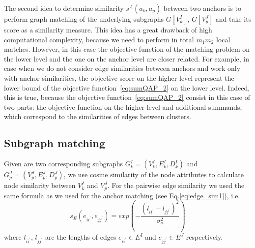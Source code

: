The second idea to determine similarity $s^A(a_k, a_p)$ between two anchors is to perform graph matching of the underlying subgraphs $G[V^I_k]$, $G[V^J_p]$ and take its score as a similarity measure. This idea has a great drawback of high computational complexity, because we need to perform in total $m_1m_2$ local matches. However, in this case the objective function of the matching problem on the lower level and the one on the anchor level are closer related. For example, in case when we do not consider edge similarities between anchors and work only with anchor similarities, the objective score on the higher level represent the lower bound of the objective function~\eqref{eq:sumQAP_2} on the lower level.  %
Indeed, this is true, because the objective function~\eqref{eq:sumQAP_2} consist in this case of two parts: the objective function on the higher level and additional summands, which correspond to the similarities of edges between clusters.
\subsection{Subgraph matching}
Given are two corresponding subgraphs $G^I_{k}=(V^I_{k},E^I_{k},D^I_{k})$ and $G^J_{p}=(V^J_{p},E^J_{p},D^J_{p})$, we use cosine similarity of the node attributes to calculate node similarity between $V^I_{k}$ and $V^J_{p}$. For the pairwise edge similarity we used the same formula as we used for the anchor matching (see Eq.\eqref{eq:edge_sim1}), i.e.\ 
\begin{equation*}
s_E(e_{ii^\prime}, e_{jj^\prime}) = exp(-\frac{(l_{ii^\prime} - l_{jj^\prime})^2}{\sigma^2_{s}})
\end{equation*}
where $l_{ii^\prime}$, $l_{jj^\prime} $ are the lengths of edges $e_{ii^\prime}\in E^I$ and $e_{jj^\prime}\in E^J$ respectively.


